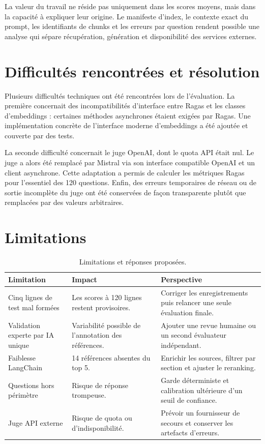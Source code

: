 \documentclass[12pt,a4paper,oneside]{report}
\begin{document}
La valeur du travail ne réside pas uniquement dans les scores moyens, mais dans
la capacité à expliquer leur origine. Le manifeste d'index, le contexte exact du
prompt, les identifiants de chunks et les erreurs par question rendent possible
une analyse qui sépare récupération, génération et disponibilité des services
externes.

\section{Difficultés rencontrées et résolution}

Plusieurs difficultés techniques ont été rencontrées lors de l'évaluation. La
première concernait des incompatibilités d'interface entre Ragas et les classes
d'embeddings : certaines méthodes asynchrones étaient exigées par Ragas. Une
implémentation concrète de l'interface moderne d'embeddings a été ajoutée et
couverte par des tests.

La seconde difficulté concernait le juge OpenAI, dont le quota API était nul.
Le juge a alors été remplacé par Mistral via son interface compatible OpenAI et
un client asynchrone. Cette adaptation a permis de calculer les métriques Ragas
pour l'essentiel des 120 questions. Enfin, des erreurs temporaires de réseau ou
de sortie incomplète du juge ont été conservées de façon transparente plutôt que
remplacées par des valeurs arbitraires.

\section{Limitations}

\begin{table}[H]
\centering
\caption{Limitations et réponses proposées.}
\label{tab:limitations}
\begin{tabularx}{\textwidth}{p{4.0cm}Y Y}
\toprule
\textbf{Limitation} & \textbf{Impact} & \textbf{Perspective}\\
\midrule
Cinq lignes de test mal formées & Les scores à 120 lignes restent provisoires. & Corriger les enregistrements puis relancer une seule évaluation finale.\\
Validation experte par IA unique & Variabilité possible de l'annotation des références. & Ajouter une revue humaine ou un second évaluateur indépendant.\\
Faiblesse LangChain & 14 références absentes du top 5. & Enrichir les sources, filtrer par section et ajuster le reranking.\\
Questions hors périmètre & Risque de réponse trompeuse. & Garde déterministe et calibration ultérieure d'un seuil de confiance.\\
Juge API externe & Risque de quota ou d'indisponibilité. & Prévoir un fournisseur de secours et conserver les artefacts d'erreurs.\\
\bottomrule
\end{tabularx}
\end{table}
\end{document}
